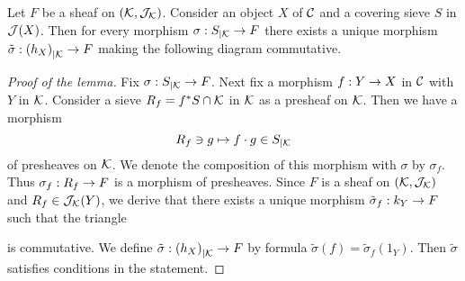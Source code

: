 \begin{lemma}\label{lemma:extensionofmorphismsforsheavesinsubcategory}
Let $F$ be a sheaf on $({\mathcal K},{\mathcal J}_{{\mathcal K}})$. Consider an object $X$ of ${\mathcal C}$ and a covering sieve $S$ in ${\mathcal J}(X)$. Then for every morphism $\sigma:S_{\mid {\mathcal K}}\rightarrow F$ there exists a unique morphism $\tilde{\sigma}:\left(h_X\right)_{\mid {\mathcal K}}\rightarrow F$ making the following diagram commutative.
\begin{center}
\end{center}
\end{lemma}
\begin{proof}[Proof of the lemma]
Fix $\sigma:S_{\mid {\mathcal K}}\rightarrow F$. Next fix a morphism $f:Y\rightarrow X$ in ${\mathcal C}$ with $Y$ in ${\mathcal K}$. Consider a sieve $R_f = f^*S\cap {\mathcal K}$ in ${\mathcal K}$ as a presheaf on ${\mathcal K}$. Then  we have a morphism
$$R_f\ni g\mapsto f\cdot g\in S_{\mid {\mathcal K}}$$
of presheaves on ${\mathcal K}$. We denote the composition of this morphism with $\sigma$ by $\sigma_f$. Thus $\sigma_f:R_f\rightarrow F$ is a morphism of presheaves. Since $F$ is a sheaf on $({\mathcal K},{\mathcal J}_{{\mathcal K}})$ and $R_f\in {\mathcal J}_{{\mathcal K}}(Y)$, we derive that there exists a unique morphism $\tilde{\sigma}_f:k_{Y}\rightarrow F$ such that
the triangle
\begin{center}
\end{center}
is commutative. We define $\tilde{\sigma}:\left(h_X\right)_{\mid {\mathcal K}}\rightarrow F$ by formula $\tilde{\sigma}(f) = \tilde{\sigma}_f(1_Y)$. Then $\tilde{\sigma}$ satisfies conditions in the statement.
\end{proof}
